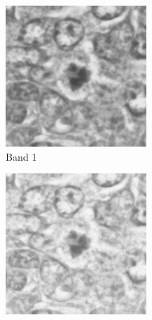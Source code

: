 \documentclass[10pt,twocolumn,letterpaper]{article}
\begin{document}
\begin{figure}[t]
\begin{subfigure}[b]{0.11\textwidth}
		\includegraphics[width=\textwidth]{img/M03_00a_0107_m1.png}
		\caption*{Band 1}
	\end{subfigure}
	\begin{subfigure}[b]{0.11\textwidth}
		\centering
		\includegraphics[width=\textwidth]{img/M03_00a_0209_m1.png}

\end{subfigure}
\end{figure}
\end{document}
